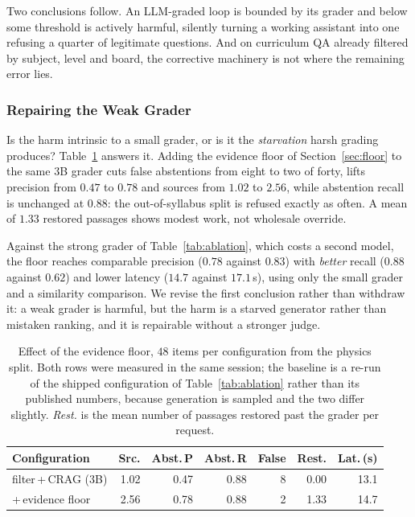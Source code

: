 \documentclass[conference]{IEEEtran}
\begin{document}
Two conclusions follow. An LLM-graded loop is bounded by its grader and below
some threshold is actively harmful, silently turning a working assistant into
one refusing a quarter of legitimate questions. And on curriculum QA already
filtered by subject, level and board, the corrective machinery is not where the
remaining error lies.

\subsubsection{Repairing the Weak Grader}
\label{sec:flooreval}
Is the harm intrinsic to a small grader, or is it the \emph{starvation} harsh
grading produces? Table~\ref{tab:floor} answers it. Adding the evidence floor
of Section~\ref{sec:floor} to the same $3$B grader cuts false abstentions from
eight to two of forty, lifts precision from $0.47$ to $0.78$ and sources from
$1.02$ to $2.56$, while abstention recall is unchanged at $0.88$: the
out-of-syllabus split is refused exactly as often. A mean of $1.33$ restored
passages shows modest work, not wholesale override.

Against the strong grader of Table~\ref{tab:ablation}, which costs a second
model, the floor reaches comparable precision ($0.78$ against $0.83$) with
\emph{better} recall ($0.88$ against $0.62$) and lower latency ($14.7$ against
$17.1$\,s), using only the small grader and a similarity comparison. We revise
the first conclusion rather than withdraw it: a weak grader is harmful, but the
harm is a starved generator rather than mistaken ranking, and it is repairable
without a stronger judge.

\begin{table}[htbp]
\caption{Effect of the evidence floor, $48$ items per configuration from the
physics split. Both rows were measured in the same session; the baseline is
a re-run of the shipped configuration of Table~\ref{tab:ablation} rather than
its published numbers, because generation is sampled and the two differ
slightly. \emph{Rest.} is the mean number of passages restored past the
grader per request.}
\label{tab:floor}
\centering
\begin{tabular}{lrrrrrr}
\toprule
\textbf{Configuration} & \textbf{Src.} & \textbf{Abst.\,P} & \textbf{Abst.\,R} & \textbf{False} & \textbf{Rest.} & \textbf{Lat.\,(s)} \\
\midrule
filter\,+\,CRAG ($3$B) & 1.02 & 0.47 & 0.88 & 8 & 0.00 & 13.1 \\
\quad +\,evidence floor & 2.56 & 0.78 & 0.88 & 2 & 1.33 & 14.7 \\
\bottomrule
\end{tabular}
\end{table}
\end{document}
